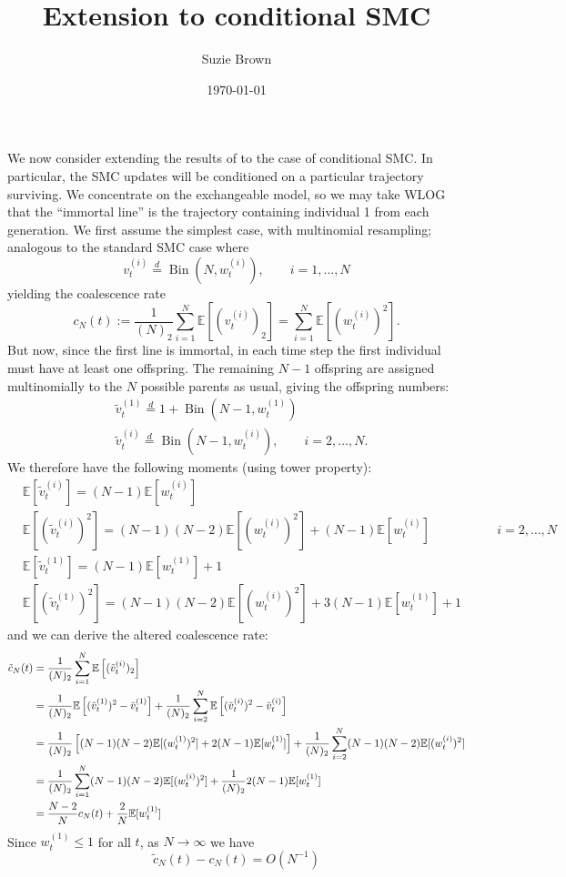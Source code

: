 \documentclass{article}
\title{Extension to conditional SMC}
\author{Suzie Brown}
\date{\today}
\newcommand{\E}{\mathbb{E}}
\newcommand{\vt}[2][t]{v_{#1}^{(#2)}}
\newcommand{\vttilde}[2][t]{\tilde{v}_{#1}^{(#2)}}
\newcommand{\wt}[2][t]{w_{#1}^{(#2)}}
\newcommand{\eqdist}{\overset{d}{=}}
\newcommand{\Bin}{\operatorname{Bin}}
\begin{document}
\maketitle
We now consider extending the results of \citet{koskela2018} to the case of conditional SMC.
In particular, the SMC updates will be conditioned on a particular trajectory surviving. We concentrate on the exchangeable model, so we may take WLOG that the ``immortal line'' is the trajectory containing individual 1 from each generation.
We first assume the simplest case, with multinomial resampling; analogous to the standard SMC case where
\begin{equation*}
\vt{i} \eqdist \Bin (N, \wt{i}), \qquad i=1,\dots,N
\end{equation*}
yielding the coalescence rate
\begin{equation}
c_N(t) := \frac{1}{(N)_2} \sum_{i=1}^{N} \E\left[ (\vt{i})_2 \right] = \sum_{i=1}^{N} \E\left[(\wt{i})^2\right].
\end{equation}
But now, since the first line is immortal, in each time step the first individual must have at least one offspring. The remaining $N-1$ offspring are assigned multinomially to the $N$ possible parents as usual, giving the offspring numbers:
\begin{align*}
& \vttilde{1} \eqdist 1 + \Bin(N-1, \wt{1}) \\
& \vttilde{i} \eqdist \Bin(N-1, \wt{i}), \qquad i=2,\dots,N.
\end{align*}
We therefore have the following moments (using tower property):
\begin{align*}
& \E[\vttilde{i}] = (N-1)\E[\wt{i}] &\\
& \E[(\vttilde{i})^2] = (N-1)(N-2)\E[(\wt{i})^2] + (N-1)\E[\wt{i}] &\qquad i=2,\dots,N \\
& \E[\vttilde{1}] = (N-1)\E[\wt{1}] + 1 \\
& \E[(\vttilde{1})^2] = (N-1)(N-2)\E[(\wt{i})^2] + 3(N-1)\E[\wt{1}] + 1 &
\end{align*}
and we can derive the altered coalescence rate:
\begin{align}
\tilde{c}_N(t) &= \frac{1}{(N)_2} \sum_{i=1}^{N} \E\left[ (\vttilde{i})_2 \right] \notag\\
&= \frac{1}{(N)_2} \E\left[ (\vttilde{1})^2 - \vttilde{1} \right] + \frac{1}{(N)_2}\sum_{i=2}^{N} \E\left[ (\vttilde{i})^2 - \vttilde{i} \right] \notag\\
&= \frac{1}{(N)_2}\left[ (N-1)(N-2)\E[(\wt{1})^2] + 2(N-1)\E[\wt{1}] \right] + \frac{1}{(N)_2} \sum_{i=2}^{N} (N-1)(N-2)\E[(\wt{i})^2] \notag\\
&= \frac{1}{(N)_2} \sum_{i=1}^{N} (N-1)(N-2)\E[(\wt{i})^2] + \frac{1}{(N)_2} 2(N-1)\E[\wt{1}] \notag\\
&= \frac{N-2}{N} c_N(t) + \frac{2}{N} \E[\wt{1}]
\end{align}
Since $\wt{1} \leq 1$ for all $t$, as $N\to\infty$ we have
\begin{equation*}
\tilde{c}_N(t) - c_N(t) = O(N^{-1})
\end{equation*}


\end{document}
